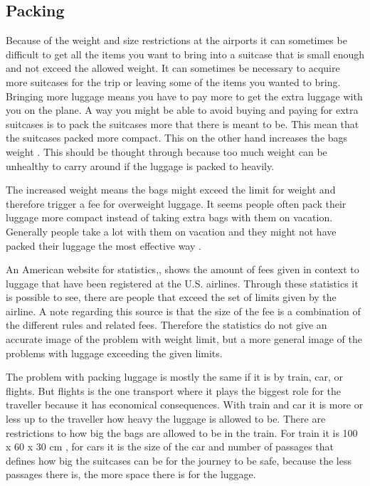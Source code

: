 \subsection*{Packing}

Because of the weight and size restrictions at the airports it can sometimes be difficult to get all the items you want to bring into a suitcase that is small enough and not exceed the allowed weight. It can sometimes be necessary to acquire more suitcases for the trip or leaving some of the items you wanted to bring. 
Bringing more luggage means you have to pay more to get the extra luggage with you on the plane. A way you might be able to avoid buying and paying for extra suitcases is to pack the suitcases more that there is meant to be. This mean that the suitcases packed more compact. This on the other hand increases the bags weight \citep{altombag}. This should be thought through because too much weight can be unhealthy to carry around if the luggage is packed to heavily.

The increased weight means the bags might exceed the limit for weight and therefore trigger a fee for overweight luggage.
It seems people often pack their luggage more compact instead of taking extra bags with them on vacation. Generally people take a lot with them on vacation and they might not have packed their luggage the most effective way \citep{airstat}.

An American website for statistics,\citep{airstat}, shows the amount of fees given in context to luggage that have been registered at the U.S. airlines. Through these statistics it is possible to see, there are people that exceed the set of limits given by the airline. A note regarding this source is that the size of the fee is a combination of the different rules and related fees. Therefore the statistics do not give an accurate image of the problem with weight limit, but a more general image of the problems with luggage exceeding the given limits.

The problem with packing luggage is mostly the same if it is by train, car, or flights. But flights is the one transport where it plays the biggest role for the traveller because it has economical consequences. With train and car it is more or less up to the traveller how heavy the luggage is allowed to be. There are restrictions to how big the bags are allowed to be in the train. For train it is 100 x 60 x 30 cm \citep{rulestrain}, for cars it is the size of the car and number of passages that defines how big the suitcases can be for the journey to be safe, because the less passages there is, the more space there is for the luggage.

